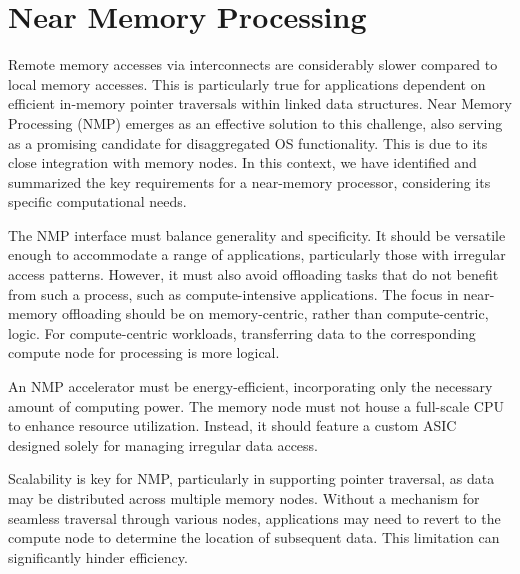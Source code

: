 \section{Near Memory Processing}
\begin{comment}
    

\begin{figure*}[ht!]
    \centering
    \texttt{[image: chase.pdf]}\vspace{-1.0em}
    \caption{\textbf{CHASE Overview.}} \vspace{-1.5em}
    \label{fig:pulse}
  \end{figure*}
\end{comment}
Remote memory accesses via interconnects are considerably slower compared to local memory accesses. This is particularly true for applications dependent on efficient in-memory pointer traversals within linked data structures. Near Memory Processing (NMP) emerges as an effective solution to this challenge, also serving as a promising candidate for disaggregated OS functionality. This is due to its close integration with memory nodes. In this context, we have identified and summarized the key requirements for a near-memory processor, considering its specific computational needs.

 The NMP interface must balance generality and specificity. It should be versatile enough to accommodate a range of applications, particularly those with irregular access patterns. However, it must also avoid offloading tasks that do not benefit from such a process, such as compute-intensive applications. The focus in near-memory offloading should be on memory-centric, rather than compute-centric, logic. For compute-centric workloads, transferring data to the corresponding compute node for processing is more logical.

 An NMP accelerator must be energy-efficient, incorporating only the necessary amount of computing power. The memory node must not house a full-scale CPU to enhance resource utilization. Instead, it should feature a custom ASIC designed solely for managing irregular data access.

 Scalability is key for NMP, particularly in supporting pointer traversal, as data may be distributed across multiple memory nodes. Without a mechanism for seamless traversal through various nodes, applications may need to revert to the compute node to determine the location of subsequent data. This limitation can significantly hinder efficiency.

